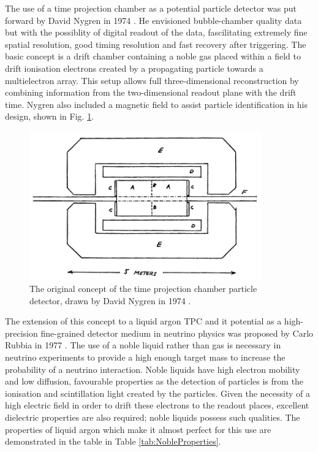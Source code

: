 The use of a time projection chamber as a potential particle detector was put forward by David Nygren in 1974 \cite{Nygren1974}.  He envisioned bubble-chamber quality data but with the possiblity of digital readout of the data, fascilitating extremely fine spatial resolution, good timing resolution and fast recovery after triggering.  The basic concept is a drift chamber containing a noble gas placed within a field to drift ionisation electrons created by a propagating particle towards a multielectron array.  This setup allows full three-dimensional reconstruction by combining information from the two-dimensional readout plane with the drift time.  Nygren also included a magnetic field to assist particle identification in his design, shown in Fig. \ref{fig:NygrenTPC}.

\begin{figure}[ht]
  \centering
  \includegraphics[width=10cm]{NygrenTPC.png}
  \caption[Original TPC design, Nygren (1974)]{The original concept of the time projection chamber particle detector, drawn by David Nygren in 1974 \cite{Nygren1974}.}
  \label{fig:NygrenTPC}
\end{figure}

The extension of this concept to a liquid argon TPC and it potential as a high-precision fine-grained detector medium in neutrino physics was proposed by Carlo Rubbia in 1977 \cite{Rubbia1977}.  The use of a noble liquid rather than gas is necessary in neutrino experiments to provide a high enough target mass to increase the probability of a neutrino interaction.  Noble liquids have high electron mobility and low diffusion, favourable properties as the detection of particles is from the ionisation and scintillation light created by the particles.  Given the necessity of a high electric field in order to drift these electrons to the readout places, excellent dielectric properties are also required; noble liquids possess such qualities.  The properties of liquid argon which make it almost perfect for this use are demonstrated in the table in Table \ref{tab:NobleProperties}.

